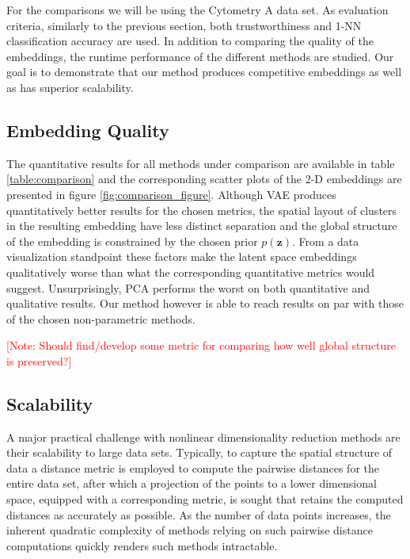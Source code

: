 For the comparisons we will be using the Cytometry A data set. As evaluation criteria, similarly to the previous section, both trustworthiness and 1-NN classification accuracy are used. In addition to comparing the quality of the embeddings, the runtime performance of the different methods are studied. Our goal is to demonstrate that our method produces competitive embeddings as well as has superior scalability.

\subsection{Embedding Quality}
\label{subsubsection:embedding_quality}

The quantitative results for all methods under comparison are available in table \ref{table:comparison} and the corresponding scatter plots of the 2-D embeddings are presented in figure \ref{fig:comparison_figure}. Although VAE produces quantitatively better results for the chosen metrics, the spatial layout of clusters in the resulting embedding have less distinct separation and the global structure of the embedding is constrained by the chosen prior $p(\mathbf{z})$. From a data visualization standpoint these factors make the latent space embeddings qualitatively worse than what the corresponding quantitative metrics would suggest. Unsurprisingly, PCA performs the worst on both quantitative and qualitative results. Our method however is able to reach results on par with those of the chosen non-parametric methods.

\textcolor{red}{[Note: Should find/develop some metric for comparing how well global structure is preserved?]}

\subsection{Scalability}
\label{subsubsection:scalability}

A major practical challenge with nonlinear dimensionality reduction methods are their scalability to large data sets. Typically, to capture the spatial structure of data a distance metric is employed to compute the pairwise distances for the entire data set, after which a projection of the points to a lower dimensional space, equipped with a corresponding metric, is sought that retains the computed distances as accurately as possible. As the number of data points increases, the inherent quadratic complexity of methods relying on such pairwise distance computations quickly renders such methods intractable.

